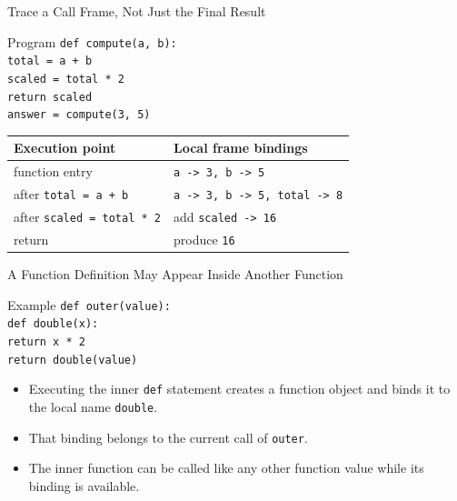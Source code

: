 \documentclass[aspectratio=169,10pt]{beamer}
\begin{document}
\begin{frame}{Trace a Call Frame, Not Just the Final Result}
  \begin{block}{Program}
    \texttt{def compute(a, b):}\\
    \hspace*{0.20in}\texttt{total = a + b}\\
    \hspace*{0.20in}\texttt{scaled = total * 2}\\
    \hspace*{0.20in}\texttt{return scaled}\\[0.08in]
    \texttt{answer = compute(3, 5)}
  \end{block}

  \begin{center}
    \renewcommand{\arraystretch}{1.25}
    \begin{tabular}{l|l}
      \textbf{Execution point} & \textbf{Local frame bindings} \\\hline
      function entry & \texttt{a -> 3, b -> 5} \\
      after \texttt{total = a + b} & \texttt{a -> 3, b -> 5, total -> 8} \\
      after \texttt{scaled = total * 2} & add \texttt{scaled -> 16} \\
      return & produce \texttt{16}
    \end{tabular}
  \end{center}
\end{frame}


\begin{frame}{A Function Definition May Appear Inside Another Function}
  \begin{block}{Example}
    \texttt{def outer(value):}\\
    \hspace*{0.20in}\texttt{def double(x):}\\
    \hspace*{0.40in}\texttt{return x * 2}\\
    \hspace*{0.20in}\texttt{return double(value)}
  \end{block}

  \begin{itemize}
    \item Executing the inner \texttt{def} statement creates a function object and binds it to the local name \texttt{double}.
    \item That binding belongs to the current call of \texttt{outer}.
    \item The inner function can be called like any other function value while its binding is available.
  \end{itemize}
\end{frame}
\end{document}
